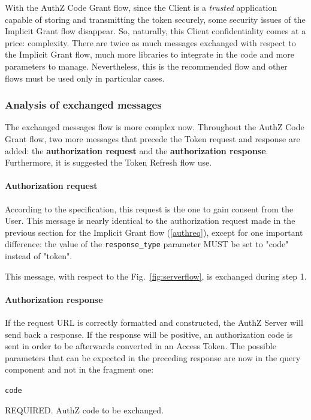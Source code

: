 \documentclass[a4paper,12pt]{article}
\def\myfig#1{Fig.~#1\xspace}
\begin{document}
With the AuthZ Code Grant flow, since the Client is a \textit{trusted} application capable of storing and transmitting the token securely, some security issues of the Implicit Grant flow disappear. So, naturally, this Client confidentiality comes at a price: complexity. There are twice as much messages exchanged with respect to the Implicit Grant flow, much more libraries to integrate in the code and more parameters to manage. Nevertheless, this is the recommended flow and other flows must be used only in particular cases.

\subsubsection{Analysis of exchanged messages}
The exchanged messages flow is more complex now. Throughout the AuthZ Code Grant flow, two more messages that precede the Token request and response are added: the \textbf{authorization request} and the \textbf{authorization response}. Furthermore, it is suggested the Token Refresh flow use.

\paragraph{Authorization request}
According to the specification, this request is the one to gain consent from the User. This message is nearly identical to the authorization request made in the previous section for the Implicit Grant flow (\ref{authreq}), except for one important difference: the value of the \texttt{response\_type} parameter MUST be set to "code" instead of "token".

\noindent This message, with respect to the \myfig{\ref{fig:serverflow}}, is exchanged during step 1. 

\paragraph{Authorization response}
If the request URL is correctly formatted and constructed, the AuthZ Server will send back a response. If the response will be positive, an authorization code is sent in order to be afterwards converted in an Access Token.
The possible parameters that can be expected in the preceding response are now in the query component and not in the fragment one:

\texttt{code}

\hspace{0.5cm}REQUIRED. AuthZ code to be exchanged.
\end{document}
